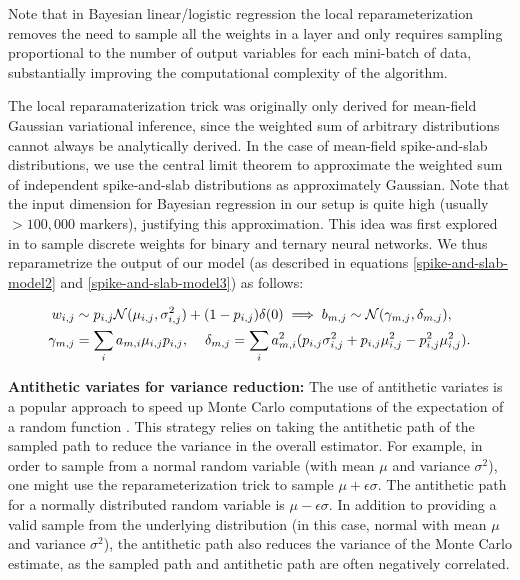 Note that in Bayesian linear/logistic regression the local reparameterization removes the need to sample all the weights in a layer and only requires sampling proportional to the number of output variables for each mini-batch of data, substantially improving the computational complexity of the algorithm.
%

%
The local reparamaterization trick was originally only derived for mean-field Gaussian variational inference, since the weighted sum of arbitrary distributions cannot always be analytically derived.
%
In the case of mean-field spike-and-slab distributions, we use the central limit theorem to approximate the weighted sum of independent spike-and-slab distributions as approximately Gaussian.
%
Note that the input dimension for Bayesian regression in our setup is quite high (usually $>100,000$ markers), justifying this approximation.
%
This idea was first explored in \cite{shayer_learning_2018} to sample discrete weights for binary and ternary neural networks.
%
We thus reparametrize the output of our model (as described in equations \ref{spike-and-slab-model2} and \ref{spike-and-slab-model3}) as follows:

\begin{align}
    w_{i,j} &\sim p_{i,j}\mathcal{N}(\mu_{i,j}, \sigma^2_{i,j}) + (1 - p_{i,j})\delta(0) \implies b_{m,j} \sim \mathcal{N}(\gamma_{m,j}, \delta_{m,j}),  \nonumber \\
    \gamma_{m,j} &= \sum_{i}a_{m,i}\mu_{i,j}p_{i,j} ,\hspace{4mm}\delta_{m,j} =  \sum_{i}a^2_{m,i}(p_{i,j}\sigma^2_{i,j} + p_{i,j}\mu^2_{i,j} - p^2_{i,j}\mu^2_{i,j}).
\end{align}


\vspace{2mm}
\noindent \textbf{Antithetic variates for variance reduction:}
%
The use of antithetic variates is a popular approach to speed up Monte Carlo computations of the expectation of a random function \cite{hammersley1956new}.
%
This strategy relies on taking the antithetic path of the sampled path to reduce the variance in the overall estimator.
%
For example, in order to sample from a normal random variable (with mean $\mu$ and variance $\sigma^2$), one might use the reparameterization trick to sample $\mu +\epsilon \sigma$.
%
The antithetic path for a normally distributed random variable is $\mu - \epsilon \sigma$.
%
In addition to providing a valid sample from the underlying distribution (in this case, normal with mean $\mu$ and variance $\sigma^2$), the antithetic path also reduces the variance of the Monte Carlo estimate, as the sampled path and antithetic path are often negatively correlated.
%

